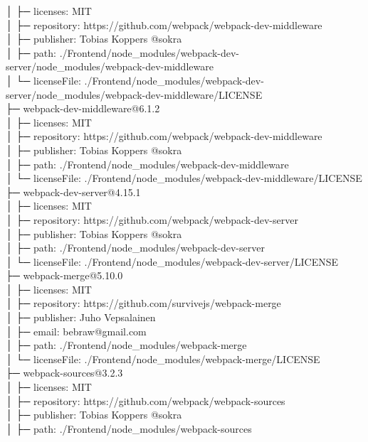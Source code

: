 │  ├─ licenses: MIT\\
│  ├─ repository: https://github.com/webpack/webpack-dev-middleware\\
│  ├─ publisher: Tobias Koppers @sokra\\
│  ├─ path: ./Frontend/node\_modules/webpack-dev-server/node\_modules/webpack-dev-middleware\\
│  └─ licenseFile: ./Frontend/node\_modules/webpack-dev-server/node\_modules/webpack-dev-middleware/LICENSE\\
├─ webpack-dev-middleware@6.1.2\\
│  ├─ licenses: MIT\\
│  ├─ repository: https://github.com/webpack/webpack-dev-middleware\\
│  ├─ publisher: Tobias Koppers @sokra\\
│  ├─ path: ./Frontend/node\_modules/webpack-dev-middleware\\
│  └─ licenseFile: ./Frontend/node\_modules/webpack-dev-middleware/LICENSE\\
├─ webpack-dev-server@4.15.1\\
│  ├─ licenses: MIT\\
│  ├─ repository: https://github.com/webpack/webpack-dev-server\\
│  ├─ publisher: Tobias Koppers @sokra\\
│  ├─ path: ./Frontend/node\_modules/webpack-dev-server\\
│  └─ licenseFile: ./Frontend/node\_modules/webpack-dev-server/LICENSE\\
├─ webpack-merge@5.10.0\\
│  ├─ licenses: MIT\\
│  ├─ repository: https://github.com/survivejs/webpack-merge\\
│  ├─ publisher: Juho Vepsalainen\\
│  ├─ email: bebraw@gmail.com\\
│  ├─ path: ./Frontend/node\_modules/webpack-merge\\
│  └─ licenseFile: ./Frontend/node\_modules/webpack-merge/LICENSE\\
├─ webpack-sources@3.2.3\\
│  ├─ licenses: MIT\\
│  ├─ repository: https://github.com/webpack/webpack-sources\\
│  ├─ publisher: Tobias Koppers @sokra\\
│  ├─ path: ./Frontend/node\_modules/webpack-sources\\
